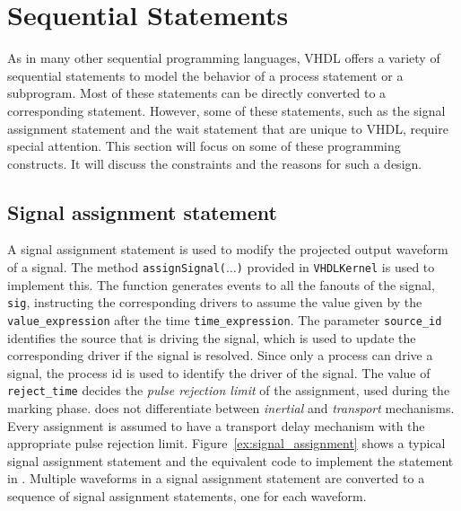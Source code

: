 \documentclass[11pt]{article}
\begin{document}
\section{Sequential Statements}
\label{chp:sequential_statement}

As in many other sequential programming languages, VHDL offers a
variety of sequential statements to model the behavior of a process
statement or a subprogram.  Most of these statements can be directly
converted to a corresponding \Cpp\/ statement.  However, some of these
statements, such as the signal assignment statement and the wait
statement that are unique to VHDL, require special attention.  This
section will focus on some of these programming constructs.  It will
discuss the constraints and the reasons for such a design.

\subsection{Signal assignment statement}


A signal assignment statement is used to modify the projected output
waveform of a signal.  The method \texttt{assignSignal($\dots$)}
provided in \texttt{VHDLKernel} is used to implement this.  The
function generates events to all the fanouts of the signal,
\texttt{sig}, instructing the corresponding drivers to assume the
value given by the \texttt{value\_expression} after the time
\texttt{time\_expression}.  The parameter \texttt{source\_id}
identifies the source that is driving the signal, which is used to
update the corresponding driver if the signal is resolved.  Since only
a process can drive a signal, the process id is used to identify the
driver of the signal.  The value of \texttt{reject\_time} decides the
\textit{pulse rejection limit} of the assignment, used during the
marking phase.  \tyvis\/ does not differentiate between
\textit{inertial} and \textit{transport} mechanisms.  Every assignment is
assumed to have a transport delay mechanism with the appropriate pulse
rejection limit.  Figure~\ref{ex:signal_assignment} shows a typical signal
assignment statement and the equivalent \Cpp\/ code to implement the
statement in \tyvis.  Multiple waveforms in a signal assignment statement
are converted to a sequence of signal assignment statements, one for each
waveform.
\end{document}
